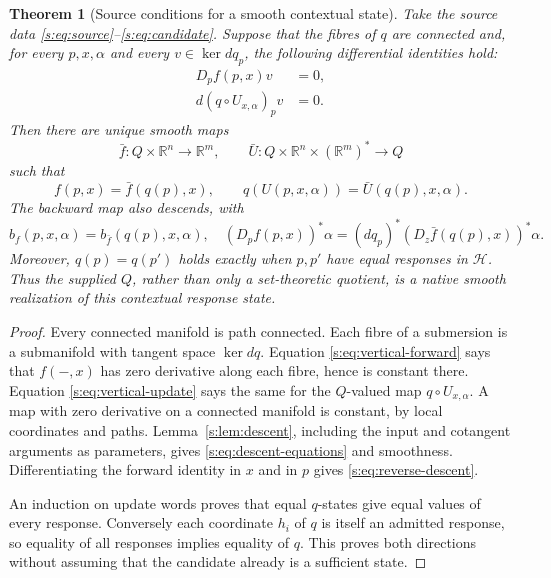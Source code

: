\documentclass[11pt]{article}
\newtheorem{theorem}{Theorem}[section]
\theoremstyle{definition}
\theoremstyle{remark}\newtheorem{remark}[theorem]{Remark}
\newcommand{\R}{\mathbb R}
\begin{document}
\begin{theorem}[Source conditions for a smooth contextual state]
\label{s:thm:source-test}
Take the source data \eqref{s:eq:source}--\eqref{s:eq:candidate}. Suppose that
the fibres of $q$ are connected and, for every $p,x,\alpha$ and every
$v\in\ker dq_p$, the following differential identities hold:
\begin{align}
 D_pf(p,x)v&=0,\label{s:eq:vertical-forward}\\
 d(q\circ U_{x,\alpha})_p v&=0.\label{s:eq:vertical-update}
\end{align}
Then there are unique smooth maps
\[
 \bar f:Q\times\R^n\to\R^m,
 \qquad
 \bar U:Q\times\R^n\times(\R^m)^*\to Q
\]
such that
\begin{equation}\label{s:eq:descent-equations}
 f(p,x)=\bar f(q(p),x),\qquad
 q(U(p,x,\alpha))=\bar U(q(p),x,\alpha).
\end{equation}
The backward map also descends, with
\begin{equation}\label{s:eq:reverse-descent}
 b_f(p,x,\alpha)=b_{\bar f}(q(p),x,\alpha),
 \quad
 (D_pf(p,x))^*\alpha
   =(dq_p)^*(D_z\bar f(q(p),x))^*\alpha.
\end{equation}
Moreover, $q(p)=q(p')$ holds exactly when $p,p'$ have equal responses in
$\mathcal H$. Thus the supplied $Q$, rather than only a set-theoretic
quotient, is a native smooth realization of this contextual response state.
\end{theorem}
\begin{proof}
Every connected manifold is path connected. Each fibre of a submersion is
a submanifold with tangent space $\ker dq$. Equation
\eqref{s:eq:vertical-forward} says that $f(-,x)$ has zero derivative along
each fibre, hence is constant there. Equation \eqref{s:eq:vertical-update}
says the same for the $Q$-valued map $q\circ U_{x,\alpha}$. A map with zero
derivative on a connected manifold is constant, by local coordinates and
paths. Lemma~\ref{s:lem:descent}, including the input and cotangent arguments
as parameters, gives \eqref{s:eq:descent-equations} and smoothness. Differentiating
the forward identity in $x$ and in $p$ gives \eqref{s:eq:reverse-descent}.

An induction on update words proves that equal $q$-states give equal values
of every response. Conversely each coordinate $h_i$ of $q$ is itself an
admitted response, so equality of all responses implies equality of $q$.
This proves both directions without assuming that the candidate already
is a sufficient state.
\end{proof}
\end{document}
